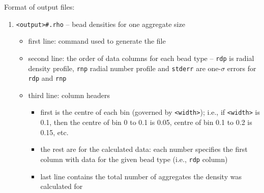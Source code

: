 \noindent
Format of output files:
\begin{enumerate}[nosep,leftmargin=20pt]
  \item \texttt{<output>\#.rho} -- bead densities for one aggregate size
    \begin{itemize}[nosep,leftmargin=5pt]
      \item first line: command used to generate the file
      \item second line: the order of data columns for each bead type --
        \texttt{rdp} is radial density profile, \texttt{rnp} radial number
        profile and \texttt{stderr} are one-$\sigma$ errors for \texttt{rdp}
        and \texttt{rnp}
      \item third line: column headers
        \begin{itemize}[nosep,leftmargin=10pt]
          \item first is the centre of each bin (governed by
            \texttt{<width>}); i.e., if \texttt{<width>} is 0.1,
            then the centre of bin 0 to 0.1 is 0.05, centre of bin 0.1 to
            0.2 is 0.15, etc.
          \item the rest are for the calculated data: each number specifies
            the first column with data for the given bead type (i.e.,
            \texttt{rdp} column)
          \item last line contains the total number of aggregates the
            density was calculated for
        \end{itemize}
    \end{itemize}
\end{enumerate}
